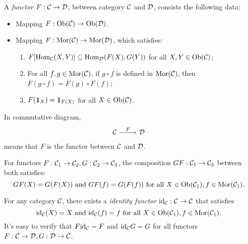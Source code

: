 \documentclass{article}
\begin{document}
\begin{defi}\label{functor}
	A \emph{functor} $F:\mathcal{C}\to\mathcal{D}$, between category $\mathcal{C}$ and $\mathcal{D}$, consists the following data:
	\begin{itemize}
		\item Mapping $F:\mathrm{Ob}(\mathcal{C})\to\mathrm{Ob}(\mathcal{D})$.
		\item Mapping $F:\mathrm{Mor}(\mathcal{C})\to\mathrm{Mor}(\mathcal{D})$, which satisfies:
		\begin{enumerate}
			\item $F[\mathrm{Hom}_{\mathcal{C}}(X,Y)]\subseteq\mathrm{Hom}_{\mathcal{D}}(F(X),G(Y))$ for all $X,Y\in\mathrm{Ob}(\mathcal{C})$;
			\item For all $f,g\in\mathrm{Mor}(\mathcal{C})$, if $g\circ f$ is defined in $\mathrm{Mor}(\mathcal{C})$, then $F(g\circ f)=F(g)\circ F(f)$;
			\item $F(\mathbf{1}_X)=\mathbf{1}_{F(X)}$ for all $X\in\mathrm{Ob}(\mathcal{C})$.
		\end{enumerate}
	\end{itemize}
	In commutative diagram,
	\[\begin{tikzcd}
			\C\arrow[r,"F"] & \D
		\end{tikzcd}\]
	means that $F$ is the functor between $\mathcal{C}$ and $\mathcal{D}$.
	
	For functors $F:\mathcal{C}_1\to\mathcal{C}_2,G:\mathcal{C}_2\to\mathcal{C}_3$, the composition $GF:\mathcal{C}_1\to\mathcal{C}_3$ between both satisfies:
		\[GF(X)=G(F(X))\ \text{and}\ GF(f)=G(F(f))\ \text{for all}\ X\in\Ob(\C_1),f\in\Mor(\C_1).\]
	
	For any category $\mathcal{C}$, there exists a \emph{identity functor} $\mathrm{id}_{\mathcal{C}}:\mathcal{C}\to\mathcal{C}$ that satisfies
		\[\mathrm{id}_{\mathcal{C}}(X)=X\ \text{and}\ \mathrm{id}_{\mathcal{C}}(f)=f\ \text{for all}\ X\in\mathrm{Ob}(\mathcal{C}_1),f\in\mathrm{Mor}(\mathcal{C}_1).\]
	It's easy to verify that $F\mathrm{id}_{\mathcal{C}}=F$ and $\mathrm{id}_{\mathcal{C}} G=G$ for all functors $F:\mathcal{C}\to\mathcal{D},G:\mathcal{D}\to\mathcal{C}$.
\end{defi}
\end{document}

